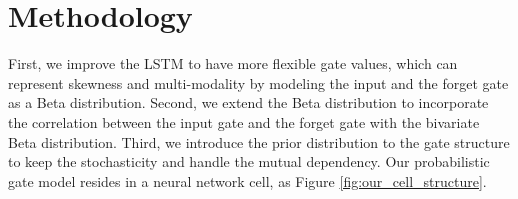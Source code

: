 \documentclass[letterpaper]{article} %
\begin{document}
\section{Methodology}
First, we improve the LSTM to have more flexible gate values, which can represent skewness and multi-modality by modeling the input and the forget gate as a Beta distribution. Second, we extend the Beta distribution to incorporate the correlation between the input gate and the forget gate with the bivariate Beta distribution. Third, we introduce the prior distribution to the gate structure to keep the stochasticity and handle the mutual dependency.
Our probabilistic gate model resides in a neural network cell, as Figure \ref{fig:our_cell_structure}.
\end{document}
